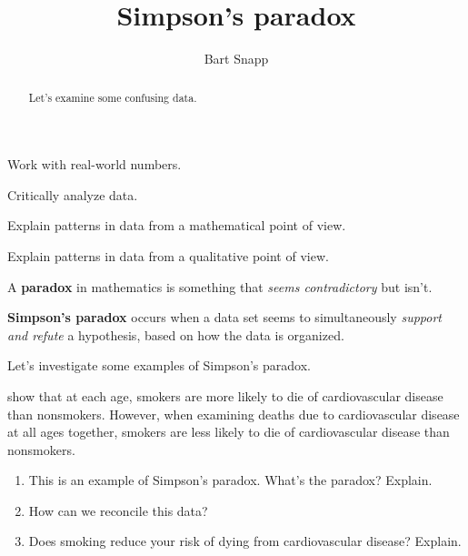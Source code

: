 \documentclass[nooutcomes,noauthor,hints,handout]{ximera}
\title{Simpson's paradox}
\author{Bart Snapp}
\begin{document}
\begin{abstract}
  Let's examine some confusing data.
\end{abstract}
\maketitle

\begin{listOutcomes}
\item Work with real-world numbers.
\item Critically analyze data.
\item Explain patterns in data from a mathematical point of view.
\item Explain patterns in data from a qualitative point of view.
\end{listOutcomes}


A \textbf{paradox} in mathematics is something that \textit{seems
contradictory} but isn't.



\textbf{Simpson's paradox} occurs when a data set seems to
simultaneously \textit{support and refute} a hypothesis, based on how
the data is organized.



Let's investigate some examples of Simpson's paradox. 


\mynewpage



\begin{question}

  show that at each age, smokers are more likely to die of
  cardiovascular disease than nonsmokers.  However, when examining
  deaths due to cardiovascular disease at all ages together, smokers
  are less likely to die of cardiovascular disease than nonsmokers.

\begin{enumerate}
\item This is an example of Simpson's paradox. What's the paradox? Explain.
\item How can we reconcile this data?
\item Does smoking reduce your risk of dying from cardiovascular disease? Explain.
\end{enumerate}
\end{question}
\mynewpage
\end{document}
